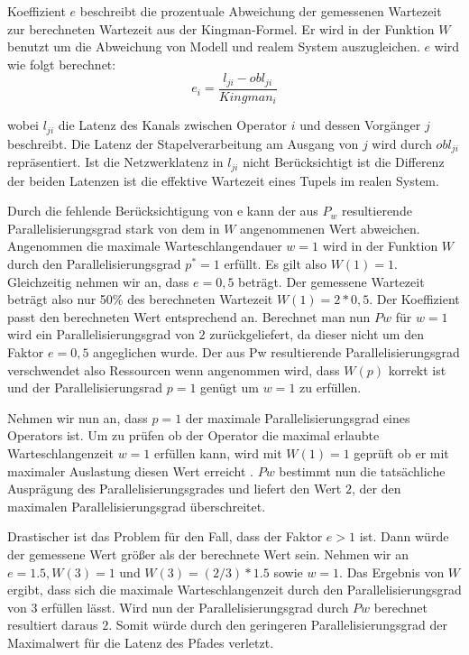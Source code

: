 Koeffizient \(e\) beschreibt die prozentuale Abweichung der gemessenen Wartezeit zur berechneten Wartezeit aus der Kingman-Formel. 
Er wird in der Funktion \(W\) benutzt um die Abweichung von Modell und realem System auszugleichen.
\(e\) wird wie folgt berechnet:
\[ e_i = \frac{l_{ji} - obl_{ji}}{Kingman_i}\]

wobei \(l_{ji}\) die Latenz des Kanals zwischen Operator \(i\) und dessen Vorgänger \(j\) beschreibt.
Die Latenz der Stapelverarbeitung am Ausgang von \(j\) wird durch \(obl_{ji}\) repräsentiert.
Ist die Netzwerklatenz in \(l_{ji}\) nicht Berücksichtigt ist die Differenz der beiden Latenzen ist die effektive Wartezeit eines Tupels im realen System.

Durch die fehlende Berücksichtigung von e kann der aus \(P_w\) resultierende Parallelisierungsgrad stark von dem in \(W\) angenommenen Wert abweichen. 
Angenommen die maximale Warteschlangendauer \(w = 1 \) wird in der Funktion \(W\) durch den Parallelisierungsgrad \(p^\ast = 1\) erfüllt. 
Es gilt also \(W(1)=1\).
Gleichzeitig nehmen wir an, dass \(e = 0,5\) beträgt. 
Der gemessene Wartezeit beträgt also nur 50\% des berechneten Wartezeit \(W(1) = 2 * 0,5\).
Der Koeffizient passt den berechneten Wert entsprechend an.
Berechnet man nun \(Pw\) für \(w = 1\) wird ein Parallelisierungsgrad von \(2\) zurückgeliefert, da dieser nicht um den Faktor \(e = 0,5\) angeglichen wurde. 
Der aus Pw resultierende Parallelisierungsgrad verschwendet also Ressourcen wenn angenommen wird, dass \(W(p)\) korrekt ist und der Parallelisierungsrad \(p=1\) genügt um \(w = 1\) zu erfüllen.

Nehmen wir nun an, dass \(p=1\) der maximale Parallelisierungsgrad eines Operators ist.
Um zu prüfen ob der Operator die maximal erlaubte Warteschlangenzeit \(w=1\) erfüllen kann, wird mit \(W(1) = 1\) geprüft ob er mit maximaler Auslastung diesen Wert erreicht . 
\(Pw\) bestimmt nun die tatsächliche Ausprägung des Parallelisierungsgrades und liefert den Wert \(2\), der den maximalen Parallelisierungsgrad überschreitet.

Drastischer ist das Problem für den Fall, dass der Faktor \(e > 1\) ist. 
Dann würde der gemessene Wert größer als der berechnete Wert sein. 
Nehmen wir an \(e = 1.5, W(3)=1\) und \(W(3) = (2/3) * 1.5\) sowie \(w=1\). 
Das Ergebnis von \(W\) ergibt, dass sich die maximale Warteschlangenzeit durch den Parallelisierungsgrad von 3 erfüllen lässt. 
Wird nun der Parallelisierungsgrad durch \(Pw\) berechnet resultiert daraus \(2\). 
Somit würde durch den geringeren Parallelisierungsgrad der Maximalwert für die Latenz des Pfades verletzt.

